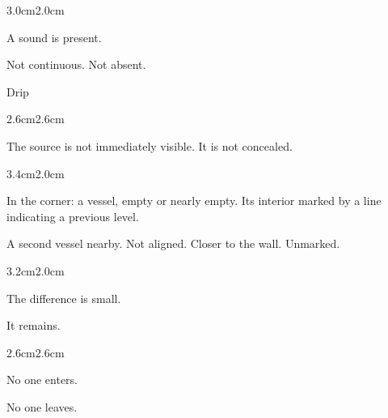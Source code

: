 \begin{adjustwidth}{3.0cm}{2.0cm}

A sound is present.

\vspace{1em}

Not continuous. Not absent.

\vspace{2em}

\end{adjustwidth}

\begin{center}
Drip
\end{center}

\begin{adjustwidth}{2.6cm}{2.6cm}

The source is not immediately visible. It is not concealed.

\vspace{2em}

\end{adjustwidth}

\begin{adjustwidth}{3.4cm}{2.0cm}

In the corner: a vessel, empty or nearly empty. Its interior marked by a
line indicating a previous level.

\vspace{2em}

A second vessel nearby. Not aligned. Closer to the wall. Unmarked.

\vspace{2em}

\end{adjustwidth}

\begin{adjustwidth}{3.2cm}{2.0cm}

The difference is small.

\vspace{1em}

It remains.

\vspace{2em}

\end{adjustwidth}

\begin{adjustwidth}{2.6cm}{2.6cm}

No one enters.

\vspace{1em}

No one leaves.

\vspace{2em}

\end{adjustwidth}

